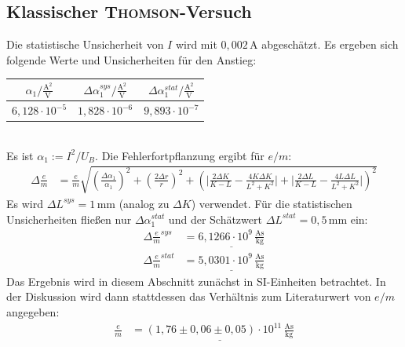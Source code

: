 \documentclass[a4paper,12pt]{article}
\newcommand{\kla}{}
\begin{document}
\subsection{Klassischer \textsc{Thomson}-Versuch}
Die statistische Unsicherheit von $I$ wird mit $0,002\,$A abgeschätzt. Es ergeben sich folgende Werte und Unsicherheiten für den Anstieg:
\begin{table}[h!]
\centering
\begin{tabular}{c|c|c}
$\alpha_1 / \frac{\mathrm{A}^2}{\mathrm{V}}$ & $\Delta \alpha_1^{sys} / \frac{\mathrm{A}^2}{\mathrm{V}}$ & $\Delta \alpha_1^{stat} / \frac{\mathrm{A}^2}{\mathrm{V}}$ \\ \hline
$6,128\cdot 10^{-5}$&$1,828\cdot 10^{-6}$&$9,893\cdot 10^{-7}$\\
\end{tabular}
\end{table}\\
Es ist $\alpha_1:=I^2/U_B$. Die Fehlerfortpflanzung ergibt für $e/m$:
\begin{align*}
\Delta\frac{e}{m}&=\frac{e}{m}\sqrt{\kla\left( {\frac{\Delta\alpha_1}{\alpha_1}} \right)^2+\kla\left( \frac{2\Delta r}{r} \right)^2+\kla\left( {\bigg|\frac{2\Delta K}{K-L}-\frac{4K\Delta K}{L^2+K^2}\bigg| + \bigg|\frac{2\Delta L}{K-L}-\frac{4L\Delta L}{L^2+K^2}\bigg|} \right)^2}
\end{align*}
Es wird $\Delta L^{sys}=1\,$mm (analog zu $\Delta K$) verwendet. Für die statistischen Unsicherheiten fließen nur $\Delta\alpha_1^{stat}$ und der Schätzwert $\Delta L^{stat}=0,5\,$mm ein:
\begin{align*}
\Delta\frac{e}{m}^{sys}&=\underline{6,1266\cdot 10^{9}\,\frac{\mathrm{As}}{\mathrm{kg}}}\\
\Delta\frac{e}{m}^{stat}&=\underline{5,0301\cdot 10^{9}\,\frac{\mathrm{As}}{\mathrm{kg}}}
\end{align*}
Das Ergebnis wird in diesem Abschnitt zunächst in SI-Einheiten betrachtet. In der Diskussion wird dann stattdessen das Verhältnis zum Literaturwert von $e/m$ angegeben:
\begin{align*}
\frac{e}{m}&=\underline{(1,76\pm 0,06\pm 0,05)\cdot 10^{11}\,\frac{\mathrm{As}}{\mathrm{kg}}}
\end{align*}
\end{document}

